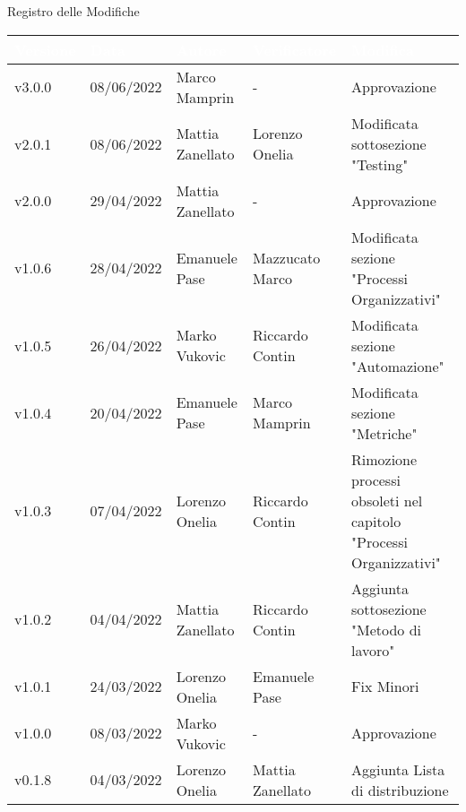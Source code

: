 \begin{center}
  \huge{Registro delle Modifiche}
\end{center}

\renewcommand\arraystretch{1,5}
{\centering
\begin{longtable}{|C{1.8cm}|C{2.1cm}|C{2cm}|C{2.4cm}|L{4.4cm}|}
  \hline
  \textcolor[HTML]{FFFFFF}{\textbf{Versione}} & \textcolor[HTML]{FFFFFF}{\textbf{Data}} & \textcolor[HTML]{FFFFFF}{\textbf{Autore}}  & \textcolor[HTML]{FFFFFF}{\textbf{Verificatore}} & \textcolor[HTML]{FFFFFF}{\textbf{Modifica}}    \\ \hline
  v3.0.0     & 08/06/2022    & Marco Mamprin &  -    & Approvazione     \\ \hline
  v2.0.1     & 08/06/2022    & Mattia Zanellato &  Lorenzo Onelia    & Modificata sottosezione "Testing"     \\ \hline
  v2.0.0     & 29/04/2022    & Mattia Zanellato &  -    & Approvazione     \\ \hline
  v1.0.6     & 28/04/2022    & Emanuele Pase &  Mazzucato Marco    & Modificata sezione "Processi Organizzativi"               \\ \hline
  v1.0.5     & 26/04/2022    & Marko Vukovic &  Riccardo Contin    & Modificata sezione "Automazione"               \\ \hline
  v1.0.4     & 20/04/2022    & Emanuele Pase &  Marco Mamprin    & Modificata sezione "Metriche"               \\ \hline
  v1.0.3     & 07/04/2022    & Lorenzo Onelia & Riccardo Contin    & Rimozione processi obsoleti nel capitolo "Processi Organizzativi"              \\ \hline
  v1.0.2     & 04/04/2022    & Mattia Zanellato & Riccardo Contin    & Aggiunta sottosezione "Metodo di lavoro"               \\ \hline
  v1.0.1     & 24/03/2022    & Lorenzo Onelia   & Emanuele Pase    & Fix Minori                \\ \hline
  v1.0.0     & 08/03/2022    & Marko Vukovic    & - & Approvazione     \\ \hline
  v0.1.8     & 04/03/2022    & Lorenzo Onelia   & Mattia Zanellato     & Aggiunta Lista di distribuzione                  \\ \hline

\end{longtable}}

